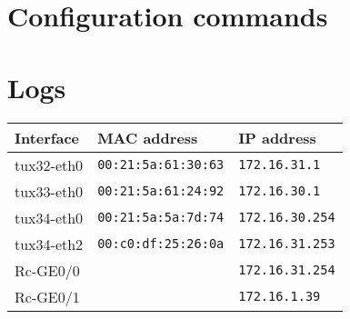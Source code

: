 \documentclass[a4paper, 11pt]{report}
\begin{document}



\restoregeometry

\chapter{Configuration commands}






\fancyhfoffset{0pt}
\chapter{Logs}

\renewcommand{\thelstlisting}{%
  \thechapter.\thesubsection(\arabic{lstlisting})%
}

\begin{center}
    \begin{tabular}{l | l | l}
        \textbf{Interface} & \textbf{MAC address}       & \textbf{IP address}    \\ \hline
        tux32-eth0         & \texttt{00:21:5a:61:30:63} & \texttt{172.16.31.1  } \\
        tux33-eth0         & \texttt{00:21:5a:61:24:92} & \texttt{172.16.30.1  } \\
        tux34-eth0         & \texttt{00:21:5a:5a:7d:74} & \texttt{172.16.30.254} \\
        tux34-eth2         & \texttt{00:c0:df:25:26:0a} & \texttt{172.16.31.253} \\
        Rc-GE0/0           & \texttt{                 } & \texttt{172.16.31.254} \\
        Rc-GE0/1           & \texttt{                 } & \texttt{172.16.1.39  } \\
    \end{tabular}
\end{center}
\end{document}
